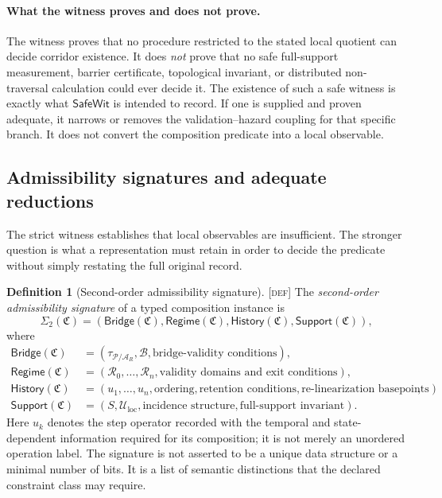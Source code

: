 \documentclass[11pt]{article}
\newcommand{\Pspace}{\ensuremath{\mathcal{P}}}
\newcommand{\ARspace}{\ensuremath{\mathcal{A}_{R}}}
\newcommand{\Defn}{\textsc{[def]}}
\theoremstyle{definition}
\newtheorem{sdefinition}{Definition}
\begin{document}
\paragraph{What the witness proves and does not prove.}\label{rem:witness-scope}
The witness proves that no procedure restricted to the stated local quotient can
decide corridor existence. It does \emph{not} prove that no safe full-support
measurement, barrier certificate, topological invariant, or distributed
non-traversal calculation could ever decide it. The existence of such a safe
witness is exactly what $\mathsf{SafeWit}$ is intended to record. If one is
supplied and proven adequate, it narrows or removes the validation--hazard
coupling for that specific branch. It does not convert the composition predicate
into a local observable.

\subsection{Admissibility signatures and adequate reductions}
\label{supp:adequate-reductions}

The strict witness establishes that local observables are insufficient. The
stronger question is what a representation must retain in order to decide the
predicate without simply restating the full original record.

\begin{sdefinition}[Second-order admissibility signature]
\label{def:second-order-signature}
\Defn{} The \emph{second-order admissibility signature} of a typed composition
instance is
\begin{equation}
\Sigma_2(\mathfrak C)
=
\left(
\mathsf{Bridge}(\mathfrak C),
\mathsf{Regime}(\mathfrak C),
\mathsf{History}(\mathfrak C),
\mathsf{Support}(\mathfrak C)
\right),
\label{eq:second-order-signature}
\end{equation}
where
\begin{align}
\mathsf{Bridge}(\mathfrak C)
&=
\left(
\tau_{\Pspace/\ARspace},
\mathcal B,
\text{bridge-validity conditions}
\right),
\label{eq:signature-bridge}
\\
\mathsf{Regime}(\mathfrak C)
&=
\left(
\mathcal R_0,\ldots,\mathcal R_n,
\text{validity domains and exit conditions}
\right),
\label{eq:signature-regime}
\\
\mathsf{History}(\mathfrak C)
&=
\left(
u_1,\ldots,u_n,
\text{ordering},
\text{retention conditions},
\text{re-linearization basepoints}
\right),
\label{eq:signature-history}
\\
\mathsf{Support}(\mathfrak C)
&=
\left(
S,
\mathcal U_{\mathrm{loc}},
\text{incidence structure},
\text{full-support invariant}
\right).
\label{eq:signature-support}
\end{align}
Here $u_k$ denotes the step operator recorded with the temporal and
state-dependent information required for its composition; it is not merely an
unordered operation label. The signature is not asserted to be a unique data
structure or a minimal number of bits. It is a list of semantic distinctions that
the declared constraint class may require.
\end{sdefinition}
\end{document}
